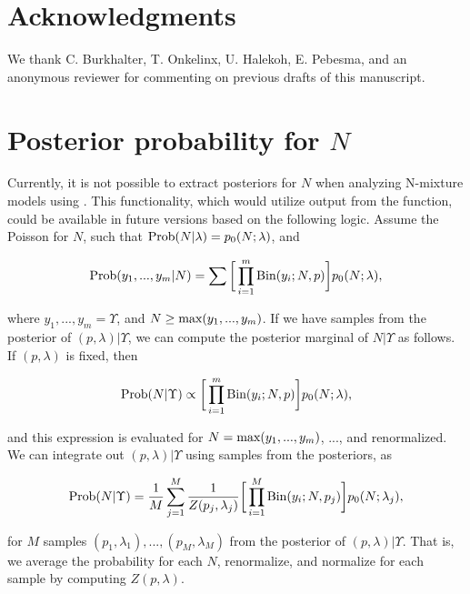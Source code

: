 \documentclass[codesnippet]{jss}
\begin{document}
\section*{Acknowledgments}
We thank C. Burkhalter, T. Onkelinx, U. Halekoh, E. Pebesma, and an anonymous reviewer for commenting on previous drafts of this manuscript.



\appendix

\section{Posterior probability for $N$}
Currently, it is not possible to extract posteriors for $N$ when analyzing N-mixture models using . This functionality, which would utilize output from the  function, could be available in future versions based on the following logic. Assume the Poisson for $N$, such that $\textnormal{Prob} (N | \lambda) = p_0(N; \lambda)$, and

$$\textnormal{Prob} (y_1, ..., y_m|N) = \sum \bigg[ \prod_{i=1}^{m} \textnormal{Bin} (y_i; N, p) \bigg] p_0(N; \lambda),$$

where $y_1, ..., y_m = \Upsilon$, and $N \geq \textnormal{max} (y_1, ..., y_m)$. If we have samples from the posterior of $(p, \lambda) | \Upsilon$, we can compute the posterior marginal of $N | \Upsilon$ as follows. If $(p, \lambda)$ is fixed, then

$$\textnormal{Prob} (N | \Upsilon) \propto \bigg[ \prod_{i=1}^{m} \textnormal{Bin} (y_i; N, p) \bigg] p_0 (N; \lambda),$$

and this expression is evaluated for $N = \textnormal{max}(y_1, ..., y_m)$, ..., and renormalized. We can integrate out $(p, \lambda) | \Upsilon$ using samples from the posteriors, as

$$\textnormal{Prob} (N | \Upsilon) = \frac{1}{M}  \sum_{j=1}^{M} \frac{1}{Z(p_j,\lambda_j)}  \bigg[ \prod_{i=1}^{M} \textnormal{Bin} (y_i; N, p_j) \bigg] p_0 (N; \lambda_j),$$

for $M$ samples $(p_1, \lambda_1), ..., (p_M, \lambda_M)$ from the posterior of $(p, \lambda) | \Upsilon$. That is, we average the probability for each $N$, renormalize, and normalize for each sample by computing $Z (p, \lambda)$.
\end{document}
